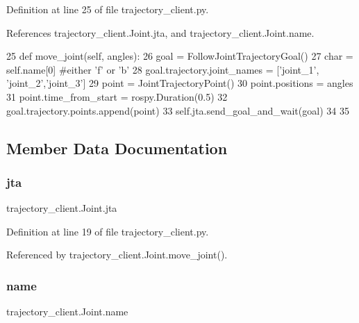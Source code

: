 Definition at line 25 of file trajectory\+\_\+client.\+py.



References trajectory\+\_\+client.\+Joint.\+jta, and trajectory\+\_\+client.\+Joint.\+name.


\begin{DoxyCode}
25         \textcolor{keyword}{def }move\_joint(self, angles):
26             goal = FollowJointTrajectoryGoal()
27             char = self.name[0] \textcolor{comment}{#either 'f' or 'b'}
28             goal.trajectory.joint\_names = [\textcolor{stringliteral}{'joint\_1'}, \textcolor{stringliteral}{'joint\_2'},\textcolor{stringliteral}{'joint\_3'}]
29             point = JointTrajectoryPoint()
30             point.positions = angles
31             point.time\_from\_start = rospy.Duration(0.5)
32             goal.trajectory.points.append(point)
33             self.jta.send\_goal\_and\_wait(goal)
34 
35 
\end{DoxyCode}


\subsection{Member Data Documentation}
\mbox{\label{classtrajectory__client_1_1_joint_a749e573716c2744874918f2e7b00c33a}} 
\subsubsection{\texorpdfstring{jta}{jta}}
{\footnotesize\ttfamily trajectory\+\_\+client.\+Joint.\+jta}



Definition at line 19 of file trajectory\+\_\+client.\+py.



Referenced by trajectory\+\_\+client.\+Joint.\+move\+\_\+joint().

\mbox{\label{classtrajectory__client_1_1_joint_a1b9ed73437add9c5b106edf224295b7e}} 
\subsubsection{\texorpdfstring{name}{name}}
{\footnotesize\ttfamily trajectory\+\_\+client.\+Joint.\+name}



